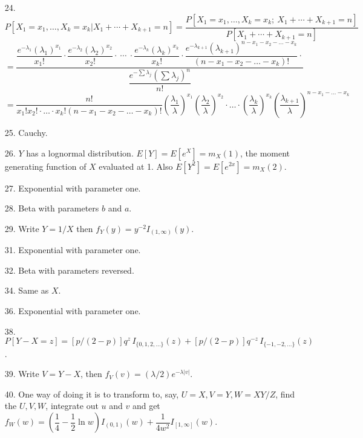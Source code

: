 \begin{enumerate}
	\item[24.] $P[X_1=x_1,\ldots,X_k=x_k\vert X_1+\cdots+X_{k+1}=n] = \dfrac{P[X_1=x_1,\ldots,X_k=x_k;\ X_1+\cdots+X_{k+1}=n]}{P[X_1+\cdots+X_{k+1}=n]}$ \\ 
	$=\dfrac{
	\dfrac{e^{-\lambda_1}\left(\lambda_1\right)^{x_1}}{x_1!} \cdot 
	\dfrac{e^{-\lambda_2}\left(\lambda_2\right)^{x_2}}{x_2!} \cdot\ \cdots\ \cdot
	\dfrac{e^{-\lambda_k}\left(\lambda_k\right)^{x_k}}{x_k!} \cdot 
	\dfrac{e^{-\lambda_{k+1}}\left(\lambda_{k+1}\right)^{n-x_1-x_2-\ldots-x_k}}{(n-x_1-x_2-\ldots-x_k)!} \cdot	
	}{\dfrac{e^{-\sum \lambda_j}\left(\sum \lambda_j\right)^n}{n!}}$ \\
	$=\dfrac{n!}{x_1!x_2!\cdot\ldots\cdot x_k! (n-x_1-x_2-\ldots-x_k)!} \left(\dfrac{\lambda_1}{\lambda}\right)^{x_1} \left(\dfrac{\lambda_2}{\lambda}\right)^{x_2}\cdot \ldots \cdot \left(\dfrac{\lambda_k}{\lambda}\right)^{x_k} \left(\dfrac{\lambda_{k+1}}{\lambda}\right)^{n-x_1-\ldots-x_k}$

	\item[25.] Cauchy.
	
	\item[26.] $Y$ has a lognormal distribution. $E[Y]=E[e^X]=m_X(1)$, the moment generating function of $X$ evaluated at 1. Also $E[Y^2]=E[e^{2x}]=m_X(2)$.
	
	\item[27.] Exponential with parameter one.
	
	\item[28.] Beta with parameters $b$ and $a$.
	
	\item[29.] Write $Y=1/X$ then $f_Y(y)=y^{-2}I_{(1,\infty)}(y)$.
	
	\item[31.] Exponential with parameter one.
	
	\item[32.] Beta with parameters reversed.
	
	\item[34.] Same as $X$.
	
	\item[36.] Exponential with parameter one.
	
	\item[38.] $P[Y-X=z] = [p/(2-p)]q^z\,I_{\{0,1,2,\ldots\}}(z) + [p/(2-p)]q^{-z}\,I_{\{-1,-2,\ldots\}}(z)$.
	
	\item[39.] Write $V=Y-X$, then $f_V(v)=(\lambda/2)e^{-\lambda\vert v\vert}$.
	
	\item[40.] One way of doing it is to transform to, say, $U=X, V=Y, W=XY/Z$, find the $U, V, W$, integrate out $u$ and $v$ and get \\
	$f_W(w) = \left(\dfrac{1}{4}-\dfrac{1}{2}\ln w\right)I_{(0,1)}(w) + \dfrac{1}{4w^2}I_{[1,\infty]}(w)$.
	

\end{enumerate}
